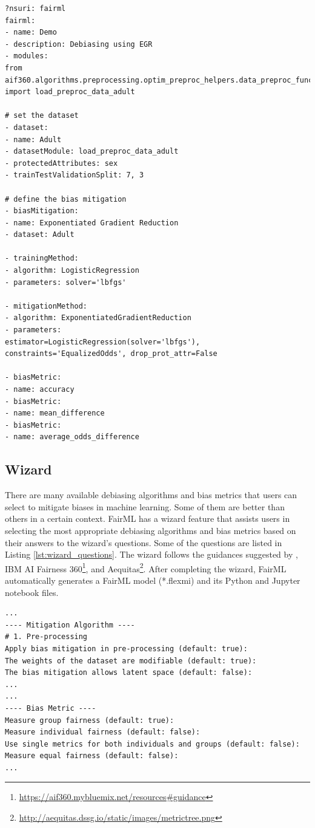 \documentclass[sigconf,review]{acmart}
\begin{document}
\begin{lstlisting}[firstnumber=1,style=yaml,caption={Bias mitigation using  Demo Exponentiated Gradient Reduction  expressed in YAML.},label=lst:fairml_model]
?nsuri: fairml
fairml:
- name: Demo
- description: Debiasing using EGR
- modules: 
from aif360.algorithms.preprocessing.optim_preproc_helpers.data_preproc_functions import load_preproc_data_adult

# set the dataset
- dataset:
- name: Adult
- datasetModule: load_preproc_data_adult
- protectedAttributes: sex
- trainTestValidationSplit: 7, 3

# define the bias mitigation
- biasMitigation:
- name: Exponentiated Gradient Reduction  
- dataset: Adult

- trainingMethod:
- algorithm: LogisticRegression
- parameters: solver='lbfgs'

- mitigationMethod:
- algorithm: ExponentiatedGradientReduction
- parameters: 
estimator=LogisticRegression(solver='lbfgs'), constraints='EqualizedOdds', drop_prot_attr=False

- biasMetric:
- name: accuracy
- biasMetric:
- name: mean_difference
- biasMetric:
- name: average_odds_difference
\end{lstlisting}

	\subsection{Wizard}
	\label{sec:wizard}
	There are many available debiasing algorithms and bias metrics that users can select to mitigate biases in machine learning. Some of them are better than others in a certain context. FairML has a wizard feature that assists users in selecting the most appropriate debiasing algorithms and bias metrics based on their answers to the wizard's questions. Some of the questions are listed in Listing  \ref{lst:wizard_questions}. The wizard follows the guidances suggested by \cite{mahoney2020ai}, IBM AI Fairness 360\footnote{\url{https://aif360.mybluemix.net/resources\#guidance}}, and Aequitas\footnote{\url{http://aequitas.dssg.io/static/images/metrictree.png}}. After completing the wizard, FairML automatically generates a FairML model (*.flexmi) and its Python and Jupyter notebook files.
	
\begin{lstlisting}[firstnumber=1,style=yaml,caption={Some the questions asked in the FairML's wizard to assist users to select the best debiasing algorithms and bias metrics.},label=lst:wizard_questions]
...
---- Mitigation Algorithm ----
# 1. Pre-processing
Apply bias mitigation in pre-processing (default: true): 
The weights of the dataset are modifiable (default: true): 
The bias mitigation allows latent space (default: false): 
...
...
---- Bias Metric ----
Measure group fairness (default: true): 
Measure individual fairness (default: false): 
Use single metrics for both individuals and groups (default: false): 
Measure equal fairness (default: false):
... 
\end{lstlisting}
	
\end{document}
